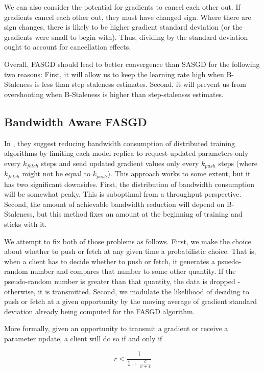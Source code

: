 \documentclass{article} %
\begin{document}
We can also consider the potential for gradients to cancel each other out.
If gradients cancel each other out, they must have changed sign.
Where there are sign changes, there is likely to be higher gradient
standard deviation (or the gradients were small to begin with).
Thus, dividing by the standard deviation ought to account for cancellation effects.

Overall, FASGD should lead to better convergence than SASGD for the following two reasons:
First, it will allow us to keep the learning rate high when B-Staleness is less than step-staleness estimates.
Second, it will prevent us from overshooting when B-Staleness is higher than step-stalensss estimates.

\subsection{Bandwidth Aware FASGD}

In \cite{Dean}, they suggest reducing bandwidth consumption of distributed training algorithms
by limiting each model replica to request updated parameters only every $k_{fetch}$ steps and send updated gradient
values only every $k_{push}$ steps (where $k_{fetch}$ might not be equal to $k_{push}$).
This approach works to some extent, but it has two significant downsides.
First, the distribution of bandwidth consumption will be somewhat peaky.
This is suboptimal from a throughput perspective.
Second, the amount of achievable bandwidth reduction will depend on B-Staleness,
but this method fixes an amount at the beginning of training and sticks with it.

We attempt to fix both of those problems as follows.
First, we make the choice about whether to push or fetch at any given time a probabilistic choice.
That is, when a client has to decide whether to push or fetch, it generates a psuedo-random number and
compares that number to some other quantity.
If the pseudo-random number is greater than that quantity, the data is dropped - otherwise, it is transmitted.
Second, we modulate the likelihood of deciding to push or fetch at a given opportunity by the
moving average of gradient standard deviation already being computed for the FASGD algorithm.

More formally, given an opportunity to transmit a gradient or receive a parameter update,
a client will do so if and only if

\begin{equation} \label{req}
  r < \frac{1}{1 + \frac{c}{v + \epsilon}} 
\end{equation}
\end{document}
